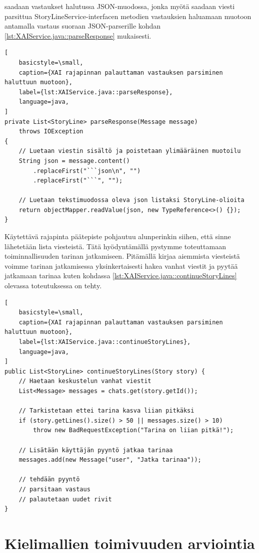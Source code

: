 saadaan vastaukset halutussa JSON-muodossa, jonka myötä saadaan viesti
parsittua StoryLineService-interfacen metodien vastauksien haluamaan
muotoon antamalla vastaus suoraan JSON-parserille kohdan
\ref{lst:XAIService.java::parseResponse} mukaisesti.

\begin{lstlisting}[
    basicstyle=\small,
    caption={XAI rajapinnan palauttaman vastauksen parsiminen haluttuun muotoon},
    label={lst:XAIService.java::parseResponse},
    language=java,
]
private List<StoryLine> parseResponse(Message message)
    throws IOException
{
    // Luetaan viestin sisältö ja poistetaan ylimääräinen muotoilu
    String json = message.content()
        .replaceFirst("```json\n", "")
        .replaceFirst("```", "");

    // Luetaan tekstimuodossa oleva json listaksi StoryLine-olioita
    return objectMapper.readValue(json, new TypeReference<>() {});
}
\end{lstlisting}

Käytettävä rajapinta päätepiste pohjautuu alunperinkin siihen, että sinne
lähetetään lista viesteistä. Tätä hyödyntämällä pystymme toteuttamaan
toiminnallisuuden tarinan jatkamiseen. Pitämällä kirjaa aiemmista viesteistä
voimme tarinan jatkamisessa yksinkertaisesti hakea vanhat viestit ja pyytää
jatkamaan tarinaa kuten kohdassa \ref{lst:XAIService.java::continueStoryLines}
olevassa toteutuksessa on tehty.

\begin{lstlisting}[
    basicstyle=\small,
    caption={XAI rajapinnan palauttaman vastauksen parsiminen haluttuun muotoon},
    label={lst:XAIService.java::continueStoryLines},
    language=java,
]
public List<StoryLine> continueStoryLines(Story story) {
    // Haetaan keskustelun vanhat viestit
    List<Message> messages = chats.get(story.getId());

    // Tarkistetaan ettei tarina kasva liian pitkäksi
    if (story.getLines().size() > 50 || messages.size() > 10)
        throw new BadRequestException("Tarina on liian pitkä!");

    // Lisätään käyttäjän pyyntö jatkaa tarinaa
    messages.add(new Message("user", "Jatka tarinaa"));

    // tehdään pyyntö
    // parsitaan vastaus
    // palautetaan uudet rivit
}
\end{lstlisting}

\section{Kielimallien toimivuuden arviointia}

